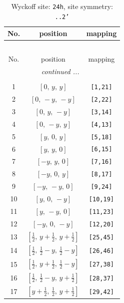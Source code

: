 \documentclass[fleqn,8pt]{jsarticle}
\begin{document}
\begin{longtable}{ccc}
\caption{Wyckoff site: {\tt 24h}, site symmetry: {\tt ..2'}}
 \\
 \hline \hline
No. & position & mapping \\ \hline \endfirsthead

\multicolumn{2}{l}{\tablename\ \thetable{}} \\
 \hline \hline
No. & position & mapping \\ \hline \endhead

 \hline \hline
\multicolumn{2}{r}{\footnotesize\it continued ...} \\ \endfoot

 \hline \hline
\multicolumn{2}{r}{} \\ \endlastfoot

1 & $\left[ 0,\, y,\, y \right]$ & {\tt [1,21]} \\ \hline
2 & $\left[ 0,\, - y,\, - y \right]$ & {\tt [2,22]} \\ \hline
3 & $\left[ 0,\, y,\, - y \right]$ & {\tt [3,14]} \\ \hline
4 & $\left[ 0,\, - y,\, y \right]$ & {\tt [4,13]} \\ \hline
5 & $\left[ y,\, 0,\, y \right]$ & {\tt [5,18]} \\ \hline
6 & $\left[ y,\, y,\, 0 \right]$ & {\tt [6,15]} \\ \hline
7 & $\left[ - y,\, y,\, 0 \right]$ & {\tt [7,16]} \\ \hline
8 & $\left[ - y,\, 0,\, y \right]$ & {\tt [8,17]} \\ \hline
9 & $\left[ - y,\, - y,\, 0 \right]$ & {\tt [9,24]} \\ \hline
10 & $\left[ y,\, 0,\, - y \right]$ & {\tt [10,19]} \\ \hline
11 & $\left[ y,\, - y,\, 0 \right]$ & {\tt [11,23]} \\ \hline
12 & $\left[ - y,\, 0,\, - y \right]$ & {\tt [12,20]} \\ \hline
13 & $\left[ \frac{1}{2},\, y + \frac{1}{2},\, y + \frac{1}{2} \right]$ & {\tt [25,45]} \\ \hline
14 & $\left[ \frac{1}{2},\, \frac{1}{2} - y,\, \frac{1}{2} - y \right]$ & {\tt [26,46]} \\ \hline
15 & $\left[ \frac{1}{2},\, y + \frac{1}{2},\, \frac{1}{2} - y \right]$ & {\tt [27,38]} \\ \hline
16 & $\left[ \frac{1}{2},\, \frac{1}{2} - y,\, y + \frac{1}{2} \right]$ & {\tt [28,37]} \\ \hline
17 & $\left[ y + \frac{1}{2},\, \frac{1}{2},\, y + \frac{1}{2} \right]$ & {\tt [29,42]} \\ \hline

\end{longtable}
\end{document}
